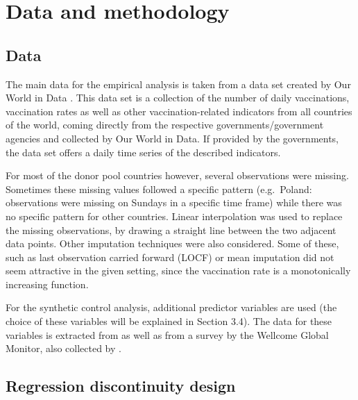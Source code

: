 \documentclass{scrbook}
\begin{document}
\chapter{Data and methodology}

\section{Data}

The main data for the empirical analysis is taken from a data set
created by Our World in Data \parencite{mathieu_global_2021}. This data
set is a collection of the number of daily vaccinations, vaccination
rates as well as other vaccination-related indicators from all countries
of the world, coming directly from the respective governments/government
agencies and collected by Our World in Data. If provided by the
governments, the data set offers a daily time series of the described
indicators.

For most of the donor pool countries however, several observations were
missing. Sometimes these missing values followed a specific pattern
(e.g.~Poland: observations were missing on Sundays in a specific time
frame) while there was no specific pattern for other countries. Linear
interpolation was used to replace the missing observations, by drawing a
straight line between the two adjacent data points. Other imputation
techniques were also considered. Some of these, such as last observation
carried forward (LOCF) or mean imputation did not seem attractive in the
given setting, since the vaccination rate is a monotonically increasing
function.

For the synthetic control analysis, additional predictor variables are
used (the choice of these variables will be explained in Section 3.4).
The data for these variables is extracted from
\textcite{eurostat_eurostat_2023} as well as from a survey by the
Wellcome Global Monitor, also collected by
\textcite{our_world_in_data_share_2020}.

\section{Regression discontinuity design}
\end{document}
